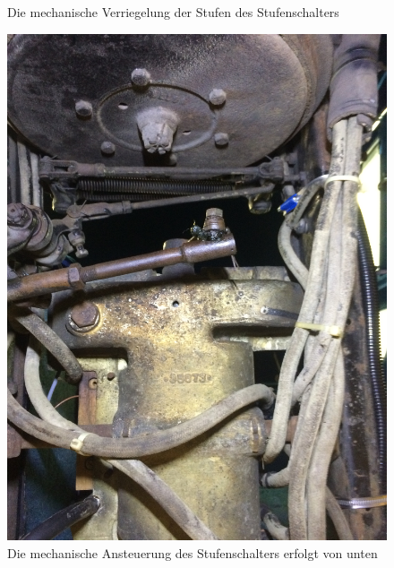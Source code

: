 \begin{landscape}
\begin{figure}[h]
	\caption{Die mechanische Verriegelung der Stufen des Stufenschalters}
	\label{fig:Stufenschalter_2}
\end{figure}
\begin{figure}[h]
	\centering
		\includegraphics[angle=180,width=1.30\textwidth]{images/Anhang/Stufenschalter_1.jpg}
	\caption{Die mechanische Ansteuerung des Stufenschalters erfolgt von unten}
	\label{fig:Stufenschalter_1}
\end{figure}
\begin{figure}[h]
	\centering

\end{figure}
\end{landscape}
